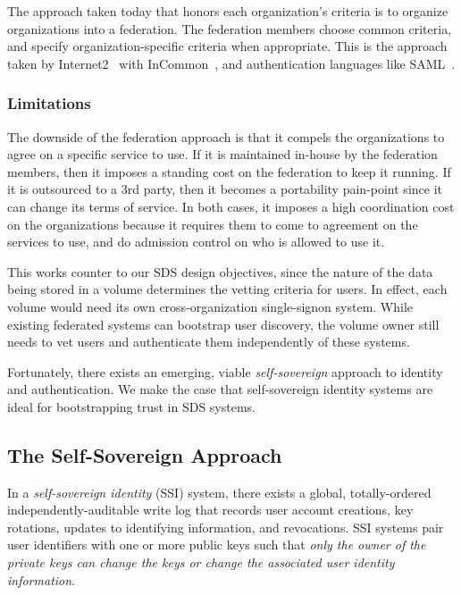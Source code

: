The approach taken today that honors each organization's criteria is to organize
organizations into a federation.  The federation members choose common criteria,
and specify organization-specific criteria when appropriate.  This is the
approach taken by Internet2~\cite{internet2} with InCommon~\cite{incommon}, and
authentication languages like SAML~\cite{saml}.

\subsubsection{Limitations}

The downside of the federation approach is that it compels the organizations to
agree on a specific service to use.  If it is maintained in-house by the
federation members, then it imposes a standing cost on the federation to keep it
running.  If it is outsourced to a 3rd party, then it becomes a portability
pain-point since it can change its terms of service.  In both cases, it imposes
a high coordination cost on the organizations because it requires them to come
to agreement on the services to use, and do admission control on who is allowed
to use it.

This works counter to our SDS design objectives, since the nature of the data being stored
in a volume determines the vetting criteria for users.  In effect, each volume
would need its own cross-organization single-signon system.  While existing
federated systems can bootstrap user discovery, the volume owner still
needs to vet users and authenticate them independently of these systems.

Fortunately, there exists an emerging, viable \emph{self-sovereign} approach
to identity and authentication.  We make the case that self-sovereign identity
systems are ideal for bootstrapping trust in SDS systems.

\subsection{The Self-Sovereign Approach}

In a \emph{self-sovereign identity} (SSI) system, there exists a global,
totally-ordered independently-auditable write log that records user account creations, key rotations,
updates to identifying information, and revocations.  SSI systems 
pair user identifiers with one or more public keys such that \emph{only the 
owner of the private keys can 
change the keys or change the associated user identity information}.

